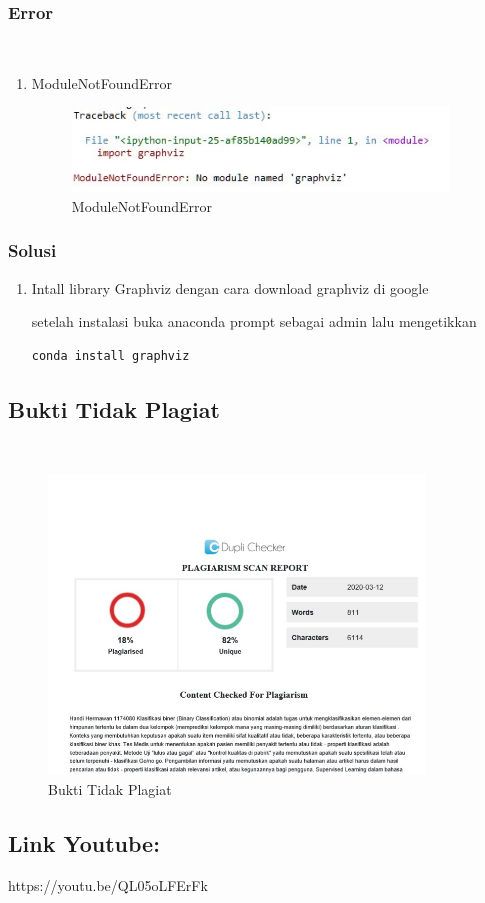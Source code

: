 \subsubsection{Error}
\hfill\\
\begin{enumerate}
\item ModuleNotFoundError

\begin{figure}[H]
\centerline{\includegraphics[width=10cm]{figures/1174080/2/error.jpg}}
\caption{ModuleNotFoundError}
\label{labelgambar}
\end{figure}
\end{enumerate}

\subsubsection{Solusi}
\begin{enumerate}
\item Intall library Graphviz dengan cara download graphviz di google

setelah instalasi buka anaconda prompt sebagai admin lalu mengetikkan
\begin{lstlisting}
conda install graphviz
\end{lstlisting} 
\end{enumerate}

\subsection{Bukti Tidak Plagiat}
\hfill\\
\begin{figure}[H]
\centerline{\includegraphics[width=10cm]{figures/1174080/2/plagiat.jpg}}
\caption{Bukti Tidak Plagiat}
\label{labelgambar}
\end{figure}

\subsection{Link Youtube:}
https://youtu.be/QL05oLFErFk
